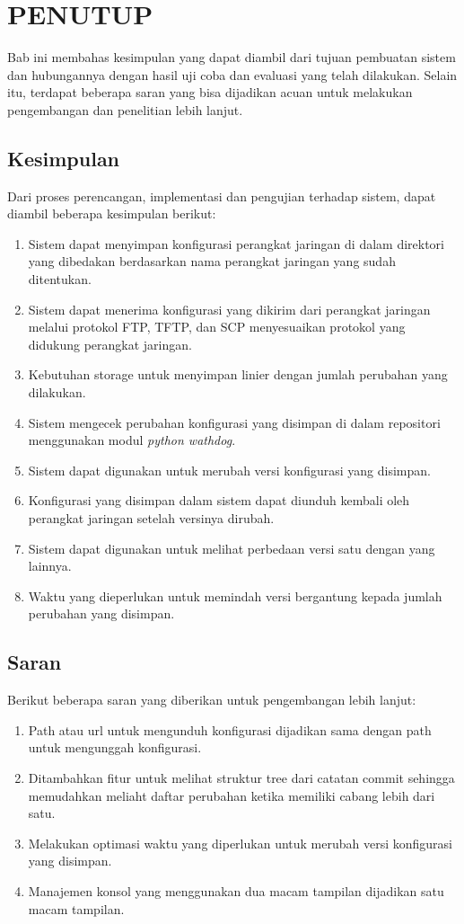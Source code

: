 \chapter{PENUTUP}
    Bab ini membahas kesimpulan yang dapat diambil dari tujuan pembuatan sistem dan hubungannya dengan hasil uji coba dan evaluasi yang telah dilakukan. Selain itu, terdapat beberapa saran yang bisa dijadikan acuan untuk melakukan pengembangan dan penelitian lebih lanjut.
        
	\section{Kesimpulan}
        Dari proses perencangan, implementasi dan pengujian terhadap sistem, dapat diambil beberapa kesimpulan berikut:
		\begin{enumerate}
			\item Sistem dapat menyimpan konfigurasi perangkat jaringan di dalam direktori yang dibedakan berdasarkan nama perangkat jaringan yang sudah ditentukan.
			\item Sistem dapat menerima konfigurasi yang dikirim dari perangkat jaringan melalui protokol FTP, TFTP, dan SCP menyesuaikan protokol yang didukung perangkat jaringan.
            \item Kebutuhan storage untuk menyimpan linier dengan jumlah perubahan yang dilakukan.
            \item Sistem mengecek perubahan konfigurasi yang disimpan di dalam repositori menggunakan modul \textit{python wathdog}.
            \item Sistem dapat digunakan untuk merubah versi konfigurasi yang disimpan.
            \item Konfigurasi yang disimpan dalam sistem dapat diunduh kembali oleh perangkat jaringan setelah versinya dirubah.
            \item Sistem dapat digunakan untuk melihat perbedaan versi satu dengan yang lainnya.
            \item Waktu yang dieperlukan untuk memindah versi bergantung kepada jumlah perubahan yang disimpan.
		\end{enumerate}
        
	\section{Saran}
		Berikut beberapa saran yang diberikan untuk pengembangan lebih lanjut:
		\begin{enumerate}
			\item Path atau url untuk mengunduh konfigurasi dijadikan sama dengan path untuk mengunggah konfigurasi.
			\item Ditambahkan fitur untuk melihat struktur tree dari catatan commit sehingga memudahkan meliaht daftar perubahan ketika memiliki cabang lebih dari satu.
			\item Melakukan optimasi waktu yang diperlukan untuk merubah versi konfigurasi yang disimpan.
			\item Manajemen konsol yang menggunakan dua macam tampilan dijadikan satu macam tampilan.
		\end{enumerate}